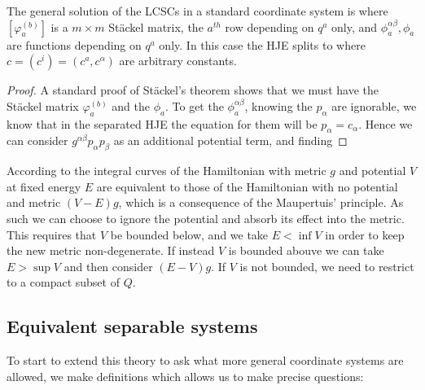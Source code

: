 \documentclass{article}
\begin{document}
\begin{prop}
The general solution of the LCSCs in a standard coordinate system is 
where $[\varphi^{(b)}_a]$ is a $m \times m$ St\"ackel matrix, the $a^{th}$ row depending on $q^a$ only, and $\phi^{\alpha\beta}_a, \phi_a$ are functions depending on $q^a$ only. In this case the HJE splits to 
where $c = (c^i) = (c^a, c^\alpha)$ are arbitrary constants. 
\end{prop}
\begin{proof}
A standard proof of St\"ackel's theorem shows that we must have the St\"ackel matrix $\varphi^{(b)}_a$ and the $\phi_a$. To get the $\phi^{\alpha\beta}_a$, knowing the $p_\alpha$ are ignorable, we know that in the separated HJE the equation for them will be $p_\alpha = c_\alpha$. Hence we can consider $g^{\alpha\beta}p_\alpha p_\beta$ as an additional potential term, and finding 
\end{proof}

\begin{remark}
According to \cite{Benenti1991} the integral curves of the Hamiltonian with metric $g$ and potential $V$ at fixed energy $E$ are equivalent to those of the Hamiltonian with no potential and metric $(V-E)g$, which is a consequence of the Maupertuis' principle. As such we can choose to ignore the potential and absorb its effect into the metric. This requires that $V$ be bounded below, and we take $E < \inf V$ in order to keep the new metric non-degenerate. If instead $V$ is bounded abouve we can take $E > \sup V$ and then consider $(E-V)g$. If $V$ is not bounded, we need to restrict to a compact subset of $Q$. 
\end{remark}


\subsection{Equivalent separable systems}

To start to extend this theory to ask what more general coordinate systems are allowed, we make definitions which allows us to make precise questions:
\end{document}
